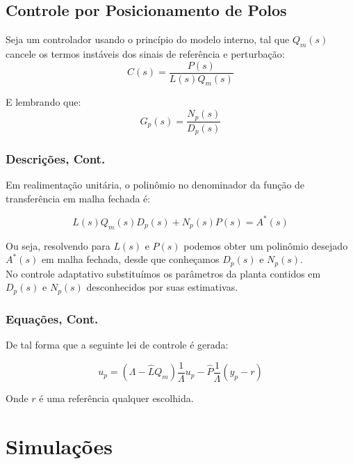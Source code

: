 \documentclass[aspectratio=169]{beamer}
\begin{document}
\subsection{Controle por Posicionamento de Polos}
\begin{frame}
Seja um controlador usando o princípio do modelo interno, tal que $Q_m(s)$ cancele os termos instáveis dos sinais de referência e perturbação:
\begin{equation*}
C(s) = \frac{P(s)}{L(s)Q_m(s)}
\end{equation*}

E lembrando que:
\begin{equation*}
G_p(s) = \frac{N_p(s)}{D_p(s)}
\end{equation*}

\end{frame}

\begin{frame}
\frametitle{Descrições, Cont.}

Em realimentação unitária, o polinômio no denominador da função de transferência em malha fechada é:

\begin{equation*}
L(s)Q_m(s)D_p(s) + N_p(s)P(s) = A^*(s)
\end{equation*}

Ou seja, resolvendo para $L(s)$ e $P(s)$ podemos obter um polinômio desejado $A^*(s)$ em malha fechada, desde que conheçamos $D_p(s)$ e $N_p(s)$.\\

No controle adaptativo substituímos os parâmetros da planta contidos em $D_p(s)$ e $N_p(s)$ desconhecidos por suas estimativas.

\end{frame}

\begin{frame}
\frametitle{Equações, Cont.}

De tal forma que a seguinte lei de controle é gerada:

\begin{equation*}
u_p = (\Lambda - \hat{L} Q_m)\frac{1}{\Lambda} u_p - \hat{P} \frac{1}{\Lambda}(y_p - r)
\end{equation*}

Onde $r$ é uma referência qualquer escolhida. 

\end{frame}


\section{Simulações}
\end{document}
